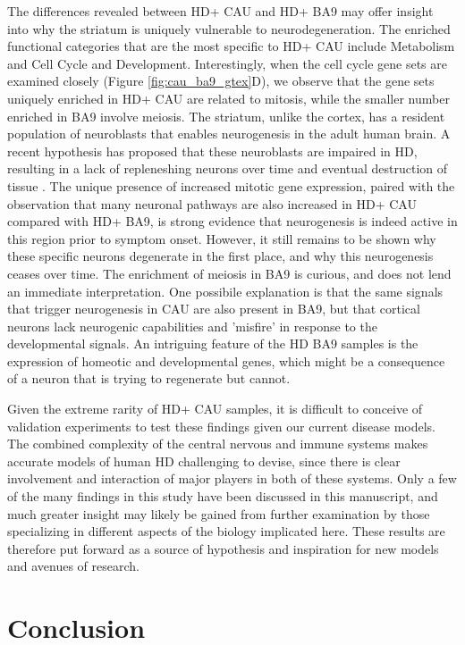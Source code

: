 \documentclass[fleqn,10pt,table]{wlscirep}
\begin{document}
The differences revealed between HD+ CAU and HD+ BA9 may offer insight into why the striatum is uniquely vulnerable to neurodegeneration.
The enriched functional categories that are the most specific to HD+ CAU include Metabolism and Cell Cycle and Development.
Interestingly, when the cell cycle gene sets are examined closely (Figure \ref{fig:cau_ba9_gtex}D), we observe that the gene sets uniquely enriched in HD+ CAU are related to mitosis, while the smaller number enriched in BA9 involve meiosis.
The striatum, unlike the cortex, has a resident population of neuroblasts that enables neurogenesis in the adult human brain\cite{Ernst2014-zw}.
A recent hypothesis has proposed that these neuroblasts are impaired in HD, resulting in a lack of repleneshing neurons over time and eventual destruction of tissue \cite{Kandasamy2018-am}.
The unique presence of increased mitotic gene expression, paired with the observation that many neuronal pathways are also increased in HD+ CAU compared with HD+ BA9, is strong evidence that neurogenesis is indeed active in this region prior to symptom onset.
However, it still remains to be shown why these specific neurons degenerate in the first place, and why this neurogenesis ceases over time.
The enrichment of meiosis in BA9 is curious, and does not lend an immediate interpretation.
One possibile explanation is that the same signals that trigger neurogenesis in CAU are also present in BA9, but that cortical neurons lack neurogenic capabilities and 'misfire' in response to the developmental signals.
An intriguing feature of the HD BA9 samples is the expression of homeotic and developmental genes, which might be a consequence of a neuron that is trying to regenerate but cannot.

Given the extreme rarity of HD+ CAU samples, it is difficult to conceive of validation experiments to test these findings given our current disease models.
The combined complexity of the central nervous and immune systems makes accurate models of human HD challenging to devise, since there is clear involvement and interaction of major players in both of these systems.
Only a few of the many findings in this study have been discussed in this manuscript, and much greater insight may likely be gained from further examination by those specializing in different aspects of the biology implicated here.
These results are therefore put forward as a source of hypothesis and inspiration for new models and avenues of research.

\section{Conclusion}
\end{document}
